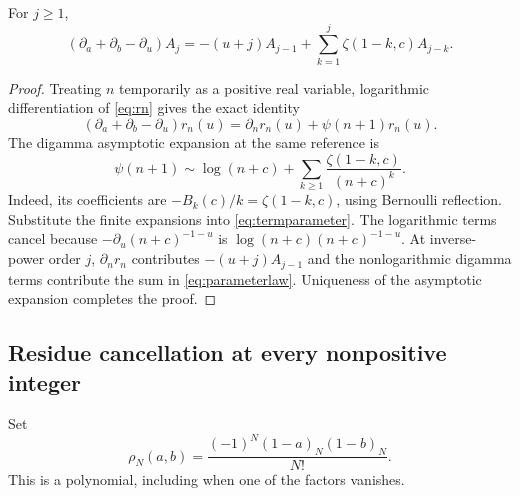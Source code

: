 \begin{lemma}\label{lem:parameterlaw}
For $j\ge1$,
\begin{equation}\label{eq:parameterlaw}
 (\partial_a+\partial_b-\partial_u)A_j
 =-(u+j)A_{j-1}+
 \sum_{k=1}^j\zeta(1-k,c)A_{j-k}.
\end{equation}
\end{lemma}
\begin{proof}
Treating $n$ temporarily as a positive real variable, logarithmic
differentiation of \eqref{eq:rn} gives the exact identity
\begin{equation}\label{eq:termparameter}
 (\partial_a+\partial_b-\partial_u)r_n(u)
 =\partial_n r_n(u)+\psi(n+1)r_n(u).
\end{equation}
The digamma asymptotic expansion at the same reference is
\begin{equation}\label{eq:digammaasymp}
 \psi(n+1)\sim\log(n+c)+
 \sum_{k\ge1}\frac{\zeta(1-k,c)}{(n+c)^k}.
\end{equation}
Indeed, its coefficients are $-B_k(c)/k=\zeta(1-k,c)$, using Bernoulli
reflection.  Substitute the finite expansions into \eqref{eq:termparameter}.
The logarithmic terms cancel because $-\partial_u(n+c)^{-1-u}$
is $\log(n+c)(n+c)^{-1-u}$.  At inverse-power order $j$,
$\partial_n r_n$ contributes $-(u+j)A_{j-1}$ and the nonlogarithmic
digamma terms contribute the sum in \eqref{eq:parameterlaw}.
Uniqueness of the asymptotic expansion completes the proof.
\end{proof}

\subsection{Residue cancellation at every nonpositive integer}
Set
\begin{equation}\label{eq:rho}
 \rho_N(a,b)=\frac{(-1)^N(1-a)_N(1-b)_N}{N!}.
\end{equation}
This is a polynomial, including when one of the factors vanishes.

